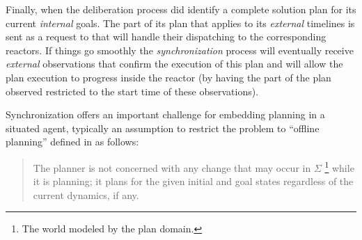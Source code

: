 Finally, when the deliberation process did identify a complete
solution plan for its current {\em internal} goals. The part of its
plan that applies to its {\em external} timelines is sent as a 
request to \rx that will handle their dispatching to the corresponding 
reactors. If things go smoothly the {\em synchronization} process will
eventually receive {\em external } observations that confirm the
execution of this plan and will allow the plan execution to progress
inside the reactor (by having the part of the plan observed restricted
to the start time of these observations).

Synchronization offers an important challenge for embedding planning
in a situated agent, typically %
an assumption to restrict the problem to ``offline planning'' defined
in \cite{ghallab04} as follows:

\begin{quotation}
  The planner is not concerned with any change that may occur in
  $\Sigma$ \footnote{The world modeled by the plan domain.} while it is
  planning; it plans for the given initial and goal states regardless
  of the current dynamics, if any. 
\end{quotation}

